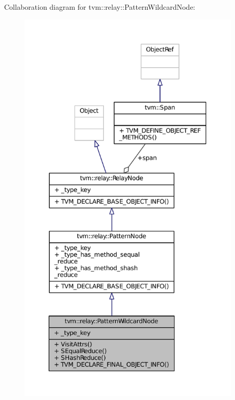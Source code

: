 Collaboration diagram for tvm\+:\+:relay\+:\+:Pattern\+Wildcard\+Node\+:
\nopagebreak
\begin{figure}[H]
\begin{center}
\leavevmode
\includegraphics[height=550pt]{classtvm_1_1relay_1_1PatternWildcardNode__coll__graph}
\end{center}
\end{figure}
